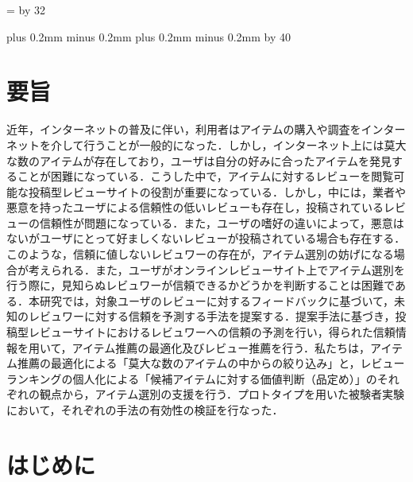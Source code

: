 \documentclass[a4paper,11pt,oneside,openany]{jsbook}
\def\linesparpage#1{\baselineskip=\textheight
   \divide\baselineskip by #1}
\def\kcharparline#1{
   \ifx\xkanjiskip\undefined
   \jintercharskip 0mm plus 0.2mm minus 0.2mm
   \else
   \xkanjiskip 0mm plus 0.2mm minus 0.2mm
   \fi
   \settowidth{\textwidth}{}
   \multiply\textwidth by #1
   }
\begin{document}
\linesparpage{32} 
\kcharparline{40}



\frontmatter

\chapter{要旨}
近年，インターネットの普及に伴い，利用者はアイテムの購入や調査をインターネットを介して行うことが一般的になった．しかし，インターネット上には莫大な数のアイテムが存在しており，ユーザは自分の好みに合ったアイテムを発見することが困難になっている．こうした中で，アイテムに対するレビューを閲覧可能な投稿型レビューサイトの役割が重要になっている．しかし，中には，業者や悪意を持ったユーザによる信頼性の低いレビューも存在し，投稿されているレビューの信頼性が問題になっている．また，ユーザの嗜好の違いによって，悪意はないがユーザにとって好ましくないレビューが投稿されている場合も存在する．このような，信頼に値しないレビュワーの存在が，アイテム選別の妨げになる場合が考えられる．また，ユーザがオンラインレビューサイト上でアイテム選別を行う際に，見知らぬレビュワーが信頼できるかどうかを判断することは困難である．本研究では，対象ユーザのレビューに対するフィードバックに基づいて，未知のレビュワーに対する信頼を予測する手法を提案する．提案手法に基づき，投稿型レビューサイトにおけるレビュワーへの信頼の予測を行い，得られた信頼情報を用いて，アイテム推薦の最適化及びレビュー推薦を行う．私たちは，アイテム推薦の最適化による「莫大な数のアイテムの中からの絞り込み」と，レビューランキングの個人化による「候補アイテムに対する価値判断（品定め）」のそれぞれの観点から，アイテム選別の支援を行う．プロトタイプを用いた被験者実験において，それぞれの手法の有効性の検証を行なった．
\par


\tableofcontents

\mainmatter

\chapter{はじめに}
\end{document}
